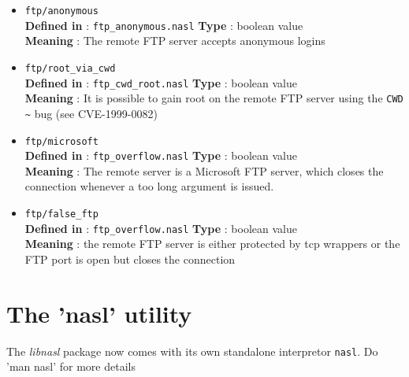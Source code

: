 \documentclass{article}
\begin{document}
\begin{itemize}
\item \verb+ftp/anonymous+\\
\textbf{Defined in} : \verb+ftp_anonymous.nasl+
\textbf{Type} : boolean value\\
\textbf{Meaning} : The remote FTP server accepts anonymous logins


\item \verb+ftp/root_via_cwd+\\
\textbf{Defined in} : \verb+ftp_cwd_root.nasl+
\textbf{Type} : boolean value\\
\textbf{Meaning} : It is possible to gain root on the remote
FTP server using the \verb+CWD ~+ bug (see CVE-1999-0082)

\item \verb+ftp/microsoft+\\
\textbf{Defined in} : \verb+ftp_overflow.nasl+
\textbf{Type} : boolean value\\
\textbf{Meaning} : The remote server is a Microsoft FTP server, which
closes the connection whenever a too long argument is issued.

\item \verb+ftp/false_ftp+\\
\textbf{Defined in} : \verb+ftp_overflow.nasl+
\textbf{Type} : boolean value\\
\textbf{Meaning} : the remote FTP server is either protected
by tcp wrappers or the FTP port is open but closes the connection

\end{itemize}



\section{The 'nasl' utility}

The \textit{libnasl} package now comes with its own standalone interpretor
\verb+nasl+. Do 'man nasl' for more details
\end{document}
